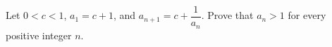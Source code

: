 Let $0<c<1$, $a_1=c+1$, and $a_{n+1}=c+\dfrac{1}{a_n}$. Prove that $a_n>1$ for every positive integer $n$.
